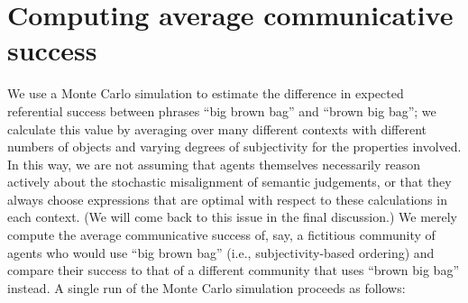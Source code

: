 \documentclass[10pt,a4paper]{article}
\begin{document}
\section{Computing average communicative success}

We use a Monte Carlo simulation to estimate the difference in expected referential success between phrases ``big brown bag'' and ``brown big bag''; we calculate this value by averaging over many different contexts with different numbers of objects and varying degrees of subjectivity for the properties involved. In this way, we are not assuming that agents themselves necessarily reason actively about the stochastic misalignment of semantic judgements, or that they always choose expressions that are optimal with respect to these calculations in each context. (We will come back to this issue in the final discussion.) We merely compute the average communicative success of, say, a fictitious community of agents who would use ``big brown bag'' (i.e., subjectivity-based ordering) and compare their success to that of a different community that uses ``brown big bag'' instead. A single run of the Monte Carlo simulation proceeds as follows:
\end{document}

